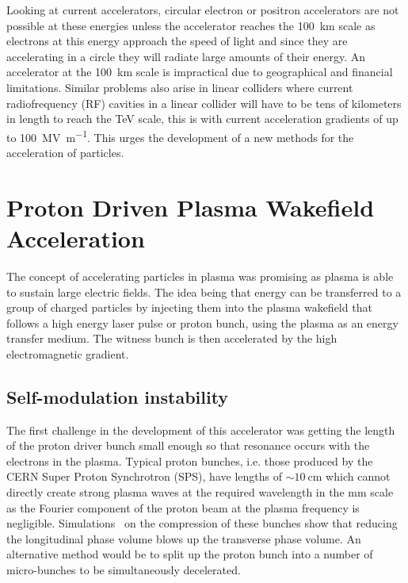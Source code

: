 \documentclass[a4paper]{report}
\begin{document}
Looking at current accelerators, circular electron or positron accelerators are
not possible at these energies unless the accelerator reaches the
\SI{100}{\kilo\meter} scale as electrons at this energy approach the speed of
light and since they are accelerating in a circle they will radiate large
amounts of their energy. An accelerator at the \SI{100}{\kilo\meter} scale is
impractical due to geographical and financial limitations.  Similar problems
also arise in linear colliders where current radiofrequency (RF) cavities in a
linear collider will have to be tens of kilometers in length to reach the
\si{\tera\electronvolt} scale, this is with current acceleration gradients of
up to \SI{100}{\mega\volt\per\meter}.  This urges the development of a new
methods for the acceleration of particles.

\section{Proton Driven Plasma Wakefield Acceleration}

The concept of accelerating particles in plasma was promising as plasma is able
to sustain large electric fields.  The idea being that energy can be
transferred to a group of charged particles by injecting them into the plasma
wakefield that follows a high energy laser pulse or proton bunch, using the
plasma as an energy transfer medium.  The witness bunch is then accelerated by
the high electromagnetic gradient.

\subsection{Self-modulation instability}

The first challenge in the development of this accelerator was getting the
length of the proton driver bunch small enough so that resonance occurs with
the electrons in the plasma.  Typical proton bunches, i.e. those produced by
the CERN Super Proton Synchrotron (SPS), have lengths of \(\sim
\SI{10}{\centi\meter}\) which cannot directly create strong plasma waves at the
required wavelength in the \si{\milli\meter} scale as the Fourier component of
the proton beam at the plasma frequency is negligible.
Simulations~\cite{kumar2010self} on the compression of these bunches show that
reducing the longitudinal phase volume blows up the transverse phase volume.
An alternative method would be to split up the proton bunch into a number of
micro-bunches to be simultaneously decelerated.
\end{document}
